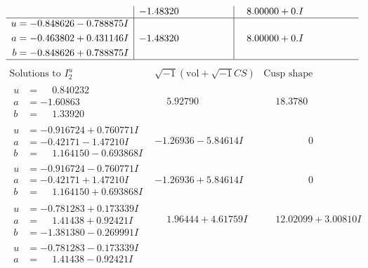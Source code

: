 \documentclass[1p]{elsarticle_modified}
\theoremstyle{definition}
\newcommand{\I}{\sqrt{-1}}
\begin{document}
$$\begin{array}{c|c|c}
 & -1.48320\phantom{ +0.000000I} & \phantom{-}8.00000 + 0. I\phantom{ +0.000000I} \\ \hline\begin{aligned}
u &= -0.848626 - 0.788875 I \\
a &= -0.463802 + 0.431146 I \\
b &= -0.848626 + 0.788875 I\end{aligned}
 & -1.48320\phantom{ +0.000000I} & \phantom{-}8.00000 + 0. I\phantom{ +0.000000I}\\
 \hline 
 \end{array}$$\newpage$$\begin{array}{c|c|c}  
\text{Solutions to }I^u_{2}& \I (\text{vol} + \sqrt{-1}CS) & \text{Cusp shape}\\
 \hline 
\begin{aligned}
u &= \phantom{-}0.840232\phantom{ +0.000000I} \\
a &= -1.60863\phantom{ +0.000000I} \\
b &= \phantom{-}1.33920\phantom{ +0.000000I}\end{aligned}
 & \phantom{-}5.92790\phantom{ +0.000000I} & \phantom{-}18.3780\phantom{ +0.000000I} \\ \hline\begin{aligned}
u &= -0.916724 + 0.760771 I \\
a &= -0.42171 - 1.47210 I \\
b &= \phantom{-}1.164150 - 0.693868 I\end{aligned}
 & -1.26936 - 5.84614 I & \phantom{-0.000000 } 0 \\ \hline\begin{aligned}
u &= -0.916724 - 0.760771 I \\
a &= -0.42171 + 1.47210 I \\
b &= \phantom{-}1.164150 + 0.693868 I\end{aligned}
 & -1.26936 + 5.84614 I & \phantom{-0.000000 } 0 \\ \hline\begin{aligned}
u &= -0.781283 + 0.173339 I \\
a &= \phantom{-}1.41438 + 0.92421 I \\
b &= -1.381380 - 0.269991 I\end{aligned}
 & \phantom{-}1.96444 + 4.61759 I & \phantom{-}12.02099 + 3.00810 I \\ \hline\begin{aligned}
u &= -0.781283 - 0.173339 I \\
a &= \phantom{-}1.41438 - 0.92421 I \\

\end{aligned}
\end{array}$$
\end{document}
